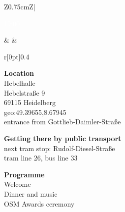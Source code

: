 \begin{landscape}
\begin{center}
    \label{social-event}%
    \enlargethispage{1\baselineskip}%
    \newlength\socialEventBoxWidth
    \setlength{\socialEventBoxWidth}{10.82cm}
    \newlength\socialEventSectionSep
    \setlength{\socialEventSectionSep}{\baselineskip}
    \noindent\begin{tabular}{Z{0.75cm}Z{\socialEventBoxWidth}|}
      \parbox[t]{\linewidth}{%
        \textcolor{white}{19:00}%
      }%
      &
      \tabularnewline
      &
      \begin{minipage}[t]{\socialEventBoxWidth}
        \noindent\begin{minipage}[t]{0.47\linewidth}
          \vspace{-0.56\baselineskip}
          \begin{wrapfigure}[6]{r}[0pt]{0.4\linewidth}%
            \vspace{-1\baselineskip}%
          \end{wrapfigure}%
          \textbf{Location}\\
          Hebelhalle\\
          Hebelstraße 9\\
          69115 Heidelberg\\
          geo:49.39655,8.67945\\
          entrance from Gottlieb-Daimler-Straße

          \vspace{\socialEventSectionSep}
          \textbf{Getting there by public transport}\\
          next tram stop: Rudolf-Diesel-Straße\\
          tram line 26, bus line 33

          \vspace{\socialEventSectionSep}
          \textbf{Programme}\\
          Welcome\\
          Dinner and music\\
          OSM Awards ceremony


\end{minipage}
\end{minipage}
\end{tabular}
\end{center}
\end{landscape}
